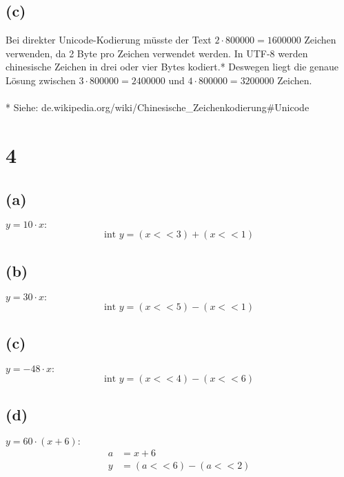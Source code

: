 \documentclass[a4paper]{scrartcl}
\begin{document}
	\subsection{(c)}
		Bei direkter Unicode-Kodierung müsste der Text \(2\cdot 800000=1600000\) Zeichen 
		verwenden, da 2 Byte pro Zeichen verwendet werden.
		In UTF-8 werden chinesische Zeichen in drei oder vier Bytes kodiert.*		
		Deswegen liegt die genaue Lösung zwischen \(3\cdot 800000=2400000\) und \(4\cdot 
		800000=3200000\) Zeichen. \\ \\
		* Siehe: de.wikipedia.org/wiki/Chinesische\_Zeichenkodierung\#Unicode	
		
		
\section{4}
	\subsection{(a)}		
		\(y = 10 \cdot x:\)\\
		\[
		\text{int } y = (x << 3) + (x << 1)
		\]

	\subsection{(b)}
		\(y = 30\cdot x:\)
		\[
		\text{int } y = (x << 5) - (x << 1)
		\]

	\subsection{(c)}
		\(y = -48\cdot x:\) \\
		\[
		\text{int } y = (x << 4) - (x << 6)
		\]
		
	\subsection{(d)}
		\(y = 60\cdot (x+6):\)			
		\begin{align}
			a&=x+6 \\
			y&=(a << 6)-(a << 2)
		\end{align}				
		
\newpage
\end{document}
